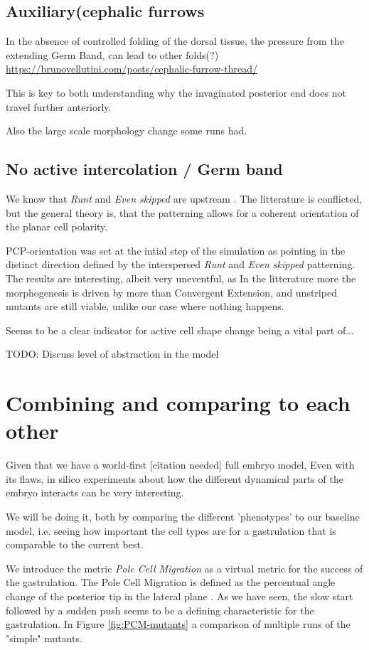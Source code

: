 \subsection{Auxiliary(cephalic furrows}

In the absence of controlled folding of the dorsal tissue, the pressure from the extending Germ Band, can lead to other folds(?) \url{https://brunovellutini.com/posts/cephalic-furrow-thread/}

This is key to both understanding why the invaginated posterior end does not travel further anteriorly.

Also the large scale morphology change some runs had.

\subsection{No active intercolation / Germ band}
\label{sec:mutantNoGB}
We know that \textit{Runt} and \textit{Even skipped} are upstream . The litterature is conflicted, but the general theory is, that the patterning allows for a coherent orientation of the planar cell polarity. 

PCP-orientation was set at the intial step of the simulation as pointing in the distinct direction defined by the interspersed \textit{Runt} and \textit{Even skipped} patterning.
The results are interesting, albeit very uneventful, as
In the litterature  \cite{butler2009cell} more the morphogenesis is driven by more than Convergent Extension, and unstriped mutants are still viable, unlike our case where nothing happens.

Seems to be a clear indicator for active cell shape change being a vital part of... 

TODO: Discuss level of abstraction in the model 

\section{Combining and comparing to each other}
Given that we have a world-first [citation needed] full embryo model, Even with its flaws, in silico experiments about how the different dynamical parts of the embryo interacts can be very interesting. 

We will be doing it, both by comparing the different 'phenotypes' to our baseline model, i.e. seeing how important the cell types are for a gastrulation that is comparable to the current best.

We introduce the metric \textit{Pole Cell Migration} as a virtual metric for the success of the gastrulation. The Pole Cell Migration is defined as the percentual angle change of the posterior tip in the lateral plane . As we have seen, the slow start followed by a sudden push seems to be a defining characteristic for the gastrulation. In Figure \ref{fig:PCM-mutants} a comparison of multiple runs of the "simple" mutants. 


